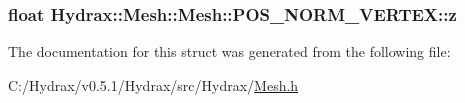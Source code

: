 \hypertarget{struct_hydrax_1_1_mesh_1_1_p_o_s___n_o_r_m___v_e_r_t_e_x_34ffa63a1b75d4d048c63918154f7f52}{
\subsubsection[{z}]{\setlength{\rightskip}{0pt plus 5cm}float Hydrax::Mesh::Mesh::POS\_\-NORM\_\-VERTEX::z}}
\label{struct_hydrax_1_1_mesh_1_1_p_o_s___n_o_r_m___v_e_r_t_e_x_34ffa63a1b75d4d048c63918154f7f52}




The documentation for this struct was generated from the following file:\begin{CompactItemize}
\item 
C:/Hydrax/v0.5.1/Hydrax/src/Hydrax/\hyperlink{_mesh_8h}{Mesh.h}\end{CompactItemize}
